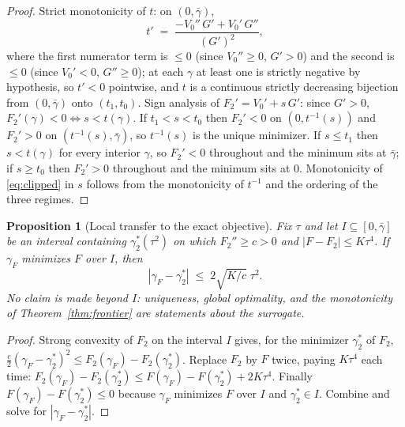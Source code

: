 \documentclass[11pt]{article}
\newtheorem{proposition}{Proposition}
\theoremstyle{remark}
\begin{document}
\begin{proof}
Strict monotonicity of $t$: on $(0,\bar\gamma)$,
\[
  t' \;=\; \frac{-V_0''\, G' + V_0'\, G''}{(G')^2},
\]
where the first numerator term is $\le 0$ (since $V_0'' \ge 0$, $G' > 0$)
and the second is $\le 0$ (since $V_0' < 0$, $G'' \ge 0$); at each $\gamma$
at least one is strictly negative by hypothesis, so $t' < 0$ pointwise, and
$t$ is a continuous strictly decreasing bijection from $(0,\bar\gamma)$ onto
$(t_1, t_0)$. Sign analysis of $F_2' = V_0' + s\, G'$: since $G' > 0$,
$F_2'(\gamma) < 0 \iff s < t(\gamma)$. If $t_1 < s < t_0$ then
$F_2' < 0$ on $(0, t^{-1}(s))$ and $F_2' > 0$ on $(t^{-1}(s), \bar\gamma)$,
so $t^{-1}(s)$ is the unique minimizer. If $s \le t_1$ then $s < t(\gamma)$
for every interior $\gamma$, so $F_2' < 0$ throughout and the minimum sits
at $\bar\gamma$; if $s \ge t_0$ then $F_2' > 0$ throughout and the minimum
sits at $0$. Monotonicity of \eqref{eq:clipped} in $s$ follows from the
monotonicity of $t^{-1}$ and the ordering of the three regimes.
\end{proof}

\begin{proposition}[Local transfer to the exact objective]
\label{prop:transfer}
Fix $\tau$ and let $I \subseteq [0, \bar\gamma]$ be an interval containing
$\gamma_2^*(\tau^2)$ on which $F_2'' \ge c > 0$ and
$|F - F_2| \le K\tau^4$. If $\gamma_F$ minimizes $F$ over $I$, then
\[
  |\gamma_F - \gamma_2^*| \;\le\; 2\sqrt{K/c}\;\tau^2 .
\]
No claim is made beyond $I$: uniqueness, global optimality, and the
monotonicity of Theorem~\ref{thm:frontier} are statements about the
surrogate.
\end{proposition}
\begin{proof}
Strong convexity of $F_2$ on the interval $I$ gives, for the minimizer
$\gamma_2^*$ of $F_2$,
$\tfrac{c}{2}(\gamma_F - \gamma_2^*)^2 \le F_2(\gamma_F) -
F_2(\gamma_2^*)$. Replace $F_2$ by $F$ twice, paying $K\tau^4$ each time:
$F_2(\gamma_F) - F_2(\gamma_2^*) \le F(\gamma_F) - F(\gamma_2^*) +
2K\tau^4$. Finally $F(\gamma_F) - F(\gamma_2^*) \le 0$ because $\gamma_F$
minimizes $F$ over $I$ and $\gamma_2^* \in I$. Combine and solve for
$|\gamma_F - \gamma_2^*|$.
\end{proof}
\end{document}

